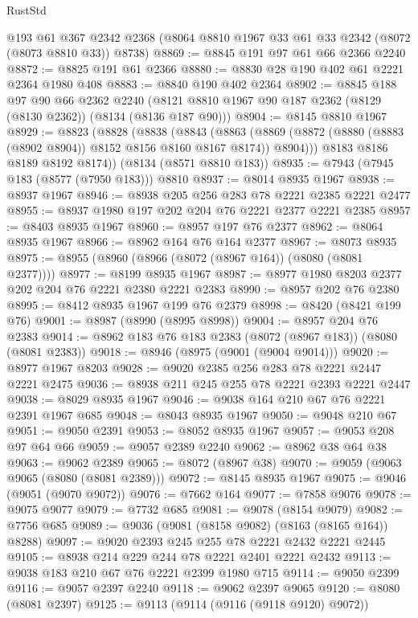 \begin{lexlean}{RustStd}
\begin{coremodule}
    @193
    @61
    @367
    @2342
    @2368
    (@8064 @8810 @1967 @33 @61 @33 @2342 (@8072 (@8073 @8810 @33)) @8738)
@8869 := @8845 @191 @97 @61 @66 @2366 @2240
@8872 := @8825 @191 @61 @2366
@8880 := @8830 @28 @190 @402 @61 @2221 @2364 @1980 @408
@8883 := @8840 @190 @402 @2364
@8902 := @8845
    @188
    @97
    @90
    @66
    @2362
    @2240
    (@8121 @8810 @1967 @90 @187 @2362 (@8129 (@8130 @2362)) (@8134 (@8136 @187 @90)))
@8904 := @8145 @8810 @1967
@8929 := @8823
    (@8828
      (@8838
        (@8843
          (@8863 (@8869 (@8872 (@8880 (@8883 (@8902 @8904)) @8152 @8156 @8160 @8167 @8174)) @8904)))
        @8183
        @8186
        @8189
        @8192
        @8174))
    (@8134 (@8571 @8810 @183))
@8935 := @7943 (@7945 @183 (@8577 (@7950 @183))) @8810
@8937 := @8014 @8935 @1967
@8938 := @8937 @1967
@8946 := @8938 @205 @256 @283 @78 @2221 @2385 @2221 @2477
@8955 := @8937 @1980 @197 @202 @204 @76 @2221 @2377 @2221 @2385
@8957 := @8403 @8935 @1967
@8960 := @8957 @197 @76 @2377
@8962 := @8064 @8935 @1967
@8966 := @8962 @164 @76 @164 @2377
@8967 := @8073 @8935
@8975 := @8955 (@8960 (@8966 (@8072 (@8967 @164)) (@8080 (@8081 @2377))))
@8977 := @8199 @8935 @1967
@8987 := @8977 @1980 @8203 @2377 @202 @204 @76 @2221 @2380 @2221 @2383
@8990 := @8957 @202 @76 @2380
@8995 := @8412 @8935 @1967 @199 @76 @2379
@8998 := @8420 (@8421 @199 @76)
@9001 := @8987 (@8990 (@8995 @8998))
@9004 := @8957 @204 @76 @2383
@9014 := @8962 @183 @76 @183 @2383 (@8072 (@8967 @183)) (@8080 (@8081 @2383))
@9018 := @8946 (@8975 (@9001 (@9004 @9014)))
@9020 := @8977 @1967 @8203
@9028 := @9020 @2385 @256 @283 @78 @2221 @2447 @2221 @2475
@9036 := @8938 @211 @245 @255 @78 @2221 @2393 @2221 @2447
@9038 := @8029 @8935 @1967
@9046 := @9038 @164 @210 @67 @76 @2221 @2391 @1967 @685
@9048 := @8043 @8935 @1967
@9050 := @9048 @210 @67
@9051 := @9050 @2391
@9053 := @8052 @8935 @1967
@9057 := @9053 @208 @97 @64 @66
@9059 := @9057 @2389 @2240
@9062 := @8962 @38 @64 @38
@9063 := @9062 @2389
@9065 := @8072 (@8967 @38)
@9070 := @9059 (@9063 @9065 (@8080 (@8081 @2389)))
@9072 := @8145 @8935 @1967
@9075 := @9046 (@9051 (@9070 @9072))
@9076 := @7662 @164
@9077 := @7858 @9076
@9078 := @9075 @9077
@9079 := @7732 @685
@9081 := @9078 (@8154 @9079)
@9082 := @7756 @685
@9089 := @9036 (@9081 (@8158 @9082) (@8163 (@8165 @164)) @8288)
@9097 := @9020 @2393 @245 @255 @78 @2221 @2432 @2221 @2445
@9105 := @8938 @214 @229 @244 @78 @2221 @2401 @2221 @2432
@9113 := @9038 @183 @210 @67 @76 @2221 @2399 @1980 @715
@9114 := @9050 @2399
@9116 := @9057 @2397 @2240
@9118 := @9062 @2397 @9065
@9120 := @8080 (@8081 @2397)
@9125 := @9113 (@9114 (@9116 (@9118 @9120) @9072))

\end{coremodule}
\end{lexlean}
